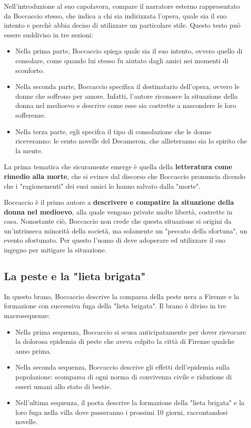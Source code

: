 \documentclass[10pt,a4paper]{article}
\begin{document}
Nell'introduzione al suo capolavora, compare il narratore esterno rappresentato da Boccaccio stesso, che indica a chi sia indirizzata l'opera, quale sia il suo intento e perchè abbia deciso di utilizzare un particolare stile. Questo testo può essere suddiviso in tre sezioni:
\begin{itemize}
	\item Nella prima parte, Boccaccio spiega quale sia il suo intento, ovvero quello di consolare, come quando lui stesso fu aiutato dagli amici nei momenti di sconforto.
	\item Nella seconda parte, Boccaccio specifica il destinatario dell'opera, ovvero le donne che soffrono per amore. Infatti, l'autore riconosce la situazione della donna nel medioevo e descrive come esse sia costrette a nascondere le loro sofferenze.
	\item Nella terza parte, egli specifca il tipo di consolazione che le donne riceveranno: le cento novelle del Decameron, che allieteranno sia lo spirito che la mente.
\end{itemize}

La prima tematica che sicuramente emerge è quella della \textbf{letteratura come rimedio alla morte}, che si evince dal discorso che Boccaccio pronuncia dicendo che i "ragionementi" dei suoi amici lo hanno salvato dalla "morte".

Boccaccio è il primo autore a \textbf{descrivere e compatire la situazione della donna nel medioevo}, alla quale vengono private molte libertà, costrette in casa. Nonostante ciò, Boccaccio non crede che questa situazione si origini da un'intrinseca minorità della società, ma solamente un "peccato della sfortuna", un evento sfortunato. Per questo l'uomo di deve adoperare ed utilizzare il suo ingegno per mitigare la situazione.

\subsection{La peste e la "lieta brigata"}

In questo brano, Boccaccio descrive  la comparsa della peste nera a Firenze e la formazione con successiva fuga della "lieta brigata". Il brano è diviso in tre macrosequenze:
\begin{itemize}
	\item Nella prima sequenza, Boccaccio si scusa anticipatamente per dover rievocare la dolorosa epidemia di peste che aveva colpito la città di Firenze qualche anno prima.
	\item Nella seconda sequenza, Boccaccio descrive gli effetti dell'epidemia sulla popolazione: scomparsa di ogni norma di convivenza civile e riduzione di esseri umani allo stato di bestie.
	\item Nell'ultima sequenza, il poeta descrive la formazione della "lieta brigata" e la loro fuga nella villa dove passeranno i prossimi 10 giorni, raccontandosi novelle.
\end{itemize}
\end{document}

